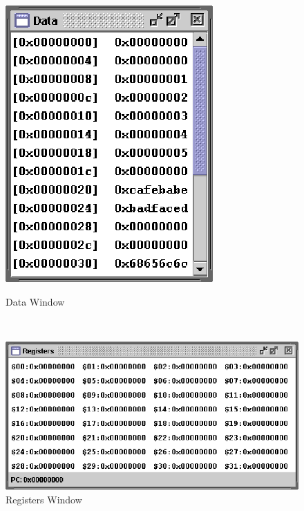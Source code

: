 \begin{center}
\begin{figure}[H]	
	\begin{center}
	\begin{minipage}[H]{2.4in}
		\begin{center}
			\includegraphics{graphics/DataWindow.eps}
		\end{center}
		
		\caption{\label{fig:Data} Data Window}
		
	\end{minipage}
	\ 
	\begin{minipage}[H]{2.7in}
		\begin{center}
			\includegraphics{graphics/RegistersWindow.eps}
		\end{center}
		\caption{\label{fig:Registers}Registers Window}
	\end{minipage}	
	\end{center}
\end{figure}
\end{center}

